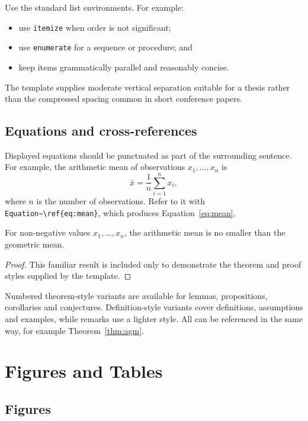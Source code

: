 \documentclass[oneside,header=auto]{liverpoolthesis}
\begin{document}
Use the standard list environments. For example:

\begin{itemize}
  \item use \texttt{itemize} when order is not significant;
  \item use \texttt{enumerate} for a sequence or procedure; and
  \item keep items grammatically parallel and reasonably concise.
\end{itemize}

The template supplies moderate vertical separation suitable for a thesis rather than the compressed spacing common in short conference papers.

\section{Equations and cross-references}

Displayed equations should be punctuated as part of the surrounding sentence.
For example, the arithmetic mean of observations $x_1,\ldots,x_n$ is
\begin{equation}
  \bar{x}=\frac{1}{n}\sum_{i=1}^{n}x_i,
  \label{eq:mean}
\end{equation}
where $n$ is the number of observations. Refer to it with
\verb|Equation~\ref{eq:mean}|, which produces Equation~\ref{eq:mean}.

\begin{theorem}\label{thm:agm}
For non-negative values $x_1,\ldots,x_n$, the arithmetic mean is no smaller
than the geometric mean.
\end{theorem}
\begin{proof}
This familiar result is included only to demonstrate the theorem and proof
styles supplied by the template.
\end{proof}

Numbered theorem-style variants are available for lemmas, propositions, corollaries and conjectures. Definition-style variants cover definitions, assumptions and examples, while remarks use a lighter style. All can be referenced in the same way, for example Theorem~\ref{thm:agm}.

\chapter{Figures and Tables}

\section{Figures}
\end{document}
